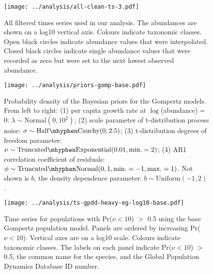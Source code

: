 
\clearpage
\renewcommand{\thetable}{S\arabic{table}}
\setcounter{table}{0}

\clearpage


\renewcommand{\thefigure}{S\arabic{figure}}
\setcounter{figure}{0}

\begin{figure}[htbp]
\begin{center}
\texttt{[image: ../analysis/all-clean-ts-3.pdf]}
\caption{
  All filtered times series used in our analysis. The abundances are shown on
  a log10 vertical axis. Colours indicate taxonomic classes. Open black circles
  indicate abundance values that were interpolated. Closed black circles
  indicate single abundance values that were recorded as zero but were set to
  the next lowest observed abundance.
}
    \label{fig:all-ts}
\end{center}
\end{figure}

\clearpage

\begin{figure}[htbp]
\begin{center}
\texttt{[image: ../analysis/priors-gomp-base.pdf]}
\caption{
  Probability density of the Bayesian priors for the Gompertz models. From left
  to right: (1) per capita growth rate at $\log$(abundance) = $0$: $\lambda \sim
  \mathrm{Normal}(0, 10^2)$; (2) scale parameter of t-distribution process
  noise: $\sigma \sim \mathrm{Half\mhyphen Cauchy} (0,
  2.5)$; (3) t-distribution degrees of freedom parameter: $\nu \sim
  \mathrm{Truncated\mhyphen Exponential}(0.01, \mathrm{min.} = 2)$; (4) AR1
  correlation coefficient of residuals: $\phi \sim \mathrm{Truncated \mhyphen
    Normal}(0, 1, \mathrm{min.} = -1, \mathrm{max.} = 1)$. Not shown is $b$,
  the density dependence parameter: $b \sim \mathrm{Uniform}(-1, 2)$.
}
  \label{fig:priors}
\end{center}
\end{figure}

\clearpage

\begin{figure}[htbp]
\begin{center}
\texttt{[image: ../analysis/ts-gpdd-heavy-eg-log10-base.pdf]}
\caption{
  Time series for populations with Pr($\nu < 10$) $>$ 0.5 using the base
  Gompertz population model. Panels are ordered by increasing Pr($\nu < 10$).
  Vertical axes are on a log10 scale. Colours indicate taxonomic classes. The
  labels on each panel indicate Pr($\nu < 10$) $>$ 0.5, the common name for the
  species, and the Global Population Dynamics Database ID number.
}
\label{fig:heavy-ts}
\end{center}
\end{figure}

